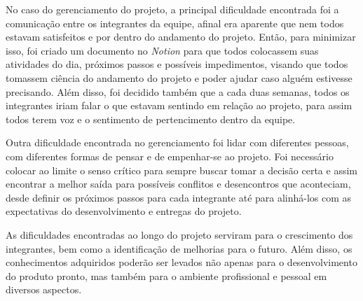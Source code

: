 \documentclass[
    12pt,               %
    openright,          %
    oneside,
    a4paper,            %
    english,            %
    brazil              %
    ]{ifsp-spo-inf-ctds} %
\begin{document}
No caso do gerenciamento do projeto, a principal dificuldade encontrada foi a comunicação entre os integrantes da equipe, afinal era aparente que nem todos estavam satisfeitos e por dentro do andamento do projeto. Então, para minimizar isso, foi criado um documento no \textit{Notion} para que todos colocassem suas atividades do dia, próximos passos e possíveis impedimentos, visando que todos tomassem ciência do andamento do projeto e poder ajudar caso alguém estivesse precisando. Além disso, foi decidido também que a cada duas semanas, todos os integrantes iriam falar o que estavam sentindo em relação ao projeto, para assim todos terem voz e o sentimento de pertencimento dentro da equipe.

Outra dificuldade encontrada no gerenciamento foi lidar com diferentes pessoas, com diferentes formas de pensar e de empenhar-se ao projeto. Foi necessário colocar ao limite o senso crítico para sempre buscar tomar a decisão certa e assim encontrar a melhor saída para possíveis conflitos e desencontros que aconteciam, desde definir os próximos passos para cada integrante até para alinhá-los com as expectativas do desenvolvimento e entregas do projeto.

As dificuldades encontradas ao longo do projeto serviram para o crescimento dos integrantes, bem como a identificação de melhorias para o futuro. Além disso, os conhecimentos adquiridos poderão ser levados não apenas para o desenvolvimento do produto pronto, mas também para o ambiente profissional e pessoal em diversos aspectos.









\end{document}
